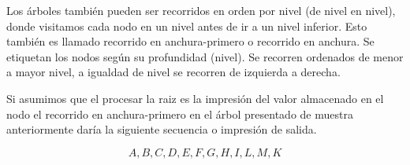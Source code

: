 Los árboles también pueden ser recorridos en orden por nivel (de nivel en nivel), donde visitamos cada nodo en un nivel antes de ir a un nivel inferior. Esto también es llamado recorrido en anchura-primero o recorrido en anchura. Se etiquetan los nodos según su profundidad
(nivel). Se recorren ordenados de menor a mayor nivel, a igualdad de nivel
se recorren de izquierda a derecha.

Si asumimos que el procesar la raiz es la impresión del valor almacenado en el nodo el recorrido en anchura-primero en el árbol presentado de muestra anteriormente daría la siguiente secuencia o impresión de salida.

$$ A, B, C, D, E, F, G, H, I, L, M, K $$
